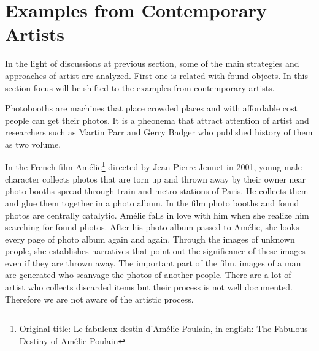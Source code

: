 





%
%
\section{Examples from Contemporary Artists}
In the light of discussions at previous section, some of the main strategies and approaches of artist are analyzed. First one is related with found objects. In this section focus will be shifted to the examples from contemporary artists.



Photobooths are machines that place crowded places and with affordable cost people can get their photos. It is a pheonema that attract attention of artist and researchers such as Martin Parr and Gerry Badger who published history of them as two volume.

In the French film Amélie\footnote{Original title: Le fabuleux destin d'Amélie Poulain, in english: The Fabulous Destiny of Amélie Poulain} directed by Jean-Pierre Jeunet in 2001, young male character collects photos that are torn up and thrown away by their owner near photo booths spread through train and metro stations of Paris. He collects them and glue them together in a photo album. In the film photo booths and found photos are centrally catalytic. Amélie falls in love with him when she realize him searching for found photos. After his photo album passed to Amélie, she looks every page of photo album again and again. Through the images of unknown people, she establishes narratives that point out the significance of these images even if they are thrown away. The important part of the film, images of a man are generated who scanvage the photos of another people. There are a lot of artist who collects discarded items but their process is not well documented. Therefore we are not aware of the artistic process. 

